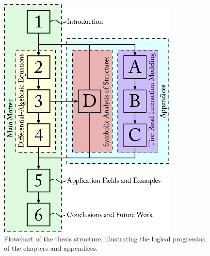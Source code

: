 \begin{figure}[htb]
  \centering
  \includegraphics[width=9cm]{./figures/chapter_1/thesis_flowchart}
  \caption{Flowchart of the thesis structure, illustrating the logical progression of the chapters and appendices.}
  \label{chap1:fig:thesis_flowchart}
\end{figure}

